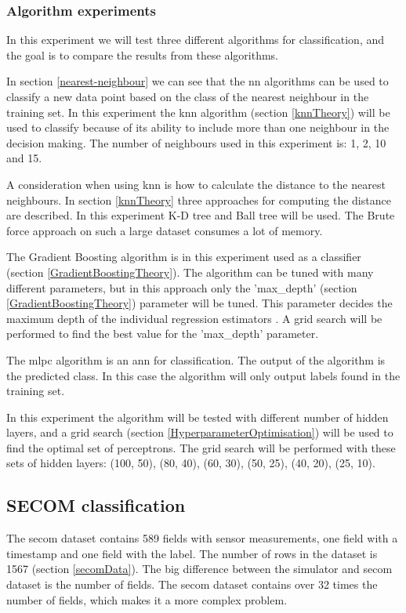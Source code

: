 \documentclass[english, a4paper]{report}
\begin{document}
{{{            \subsubsection{Algorithm experiments}
            {  
                In this experiment we will test three different algorithms for classification, and the goal is to compare the results from these algorithms.
                \par
                In section \ref{nearest-neighbour} we can see that the \gls{nn} algorithms can be used to classify a new data point based on the class of the nearest neighbour in the training set. In this experiment the \gls{knn} algorithm (section \ref{knnTheory}) will be used to classify because of its ability to include more than one neighbour in the decision making. The number of neighbours used in this experiment is: 1, 2, 10 and 15.
                \par
                A consideration when using \gls{knn} is how to calculate the distance to the nearest neighbours. In section \ref{knnTheory} three approaches for computing the distance are described. In this experiment K-D tree and Ball tree will be used. The Brute force approach on such a large dataset consumes a lot of memory.
                \par
                The Gradient Boosting algorithm is in this experiment used as a classifier (section \ref{GradientBoostingTheory}). The algorithm can be tuned with many different parameters, but in this approach only the 'max\_depth' (section \ref{GradientBoostingTheory}) parameter will be tuned. This parameter decides the maximum depth of the individual regression estimators \cite{gradientBoostingClassifier}. A grid search will be performed to find the best value for the 'max\_depth' parameter. 
                \par
                The \gls{mlpc} algorithm is an \gls{ann} for classification. The output of the algorithm is the predicted class. In this case the algorithm will only output labels found in the training set. 
                \par
                In this experiment the algorithm will be tested with different number of hidden layers, and a grid search (section \ref{HyperparameterOptimisation}) will be used to find the optimal set of perceptrons. The grid search will be performed with these sets of hidden layers: (100, 50), (80, 40), (60, 30), (50, 25), (40, 20), (25, 10).
            }
        }
        
        \subsection{SECOM classification} \label{secom-classification-experiment}
        {
            The \gls{secom} dataset contains 589 fields with sensor measurements, one field with a timestamp and one field with the label. The number of rows in the dataset is 1567 (section \ref{secomData}). The big difference between the simulator and \gls{secom} dataset is the number of fields. The \gls{secom} dataset contains over 32 times the number of fields, which makes it a more complex problem.
            
}}}
\end{document}
